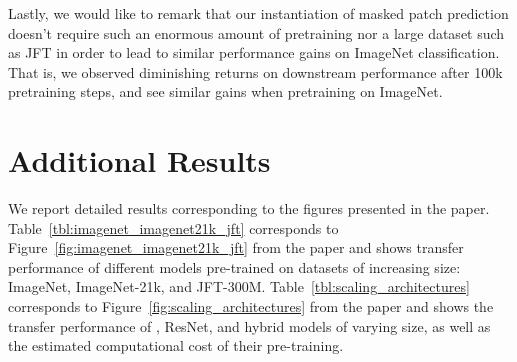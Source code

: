 Lastly, we would like to remark that our instantiation of masked patch prediction doesn't require such an enormous amount of pretraining nor a large dataset such as JFT in order to lead to similar performance gains on ImageNet classification. That is, we observed diminishing returns on downstream performance after 100k pretraining steps, and see similar gains when pretraining on ImageNet.

\section{Additional Results}

We report detailed results corresponding to the figures presented in the paper.
Table~\ref{tbl:imagenet_imagenet21k_jft} corresponds to Figure~\ref{fig:imagenet_imagenet21k_jft} from the paper and shows transfer performance of different \oursabbrv models pre-trained on datasets of increasing size: ImageNet, ImageNet-21k, and JFT-300M.
Table~\ref{tbl:scaling_architectures} corresponds to Figure~\ref{fig:scaling_architectures} from the paper and shows the transfer performance of \oursabbrv{}, ResNet, and hybrid models of varying size, as well as the estimated computational cost of their pre-training.

